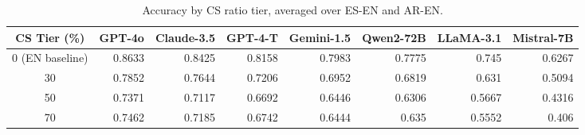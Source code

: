 \begin{table}[t]
\centering
\caption{Accuracy by CS ratio tier, averaged over ES-EN and AR-EN.}
\label{tab:dose_response}
\begin{tabular}{crrrrrrr}
\toprule
CS Tier (\%) & GPT-4o & Claude-3.5 & GPT-4-T & Gemini-1.5 & Qwen2-72B & LLaMA-3.1 & Mistral-7B \\
\midrule
0 (EN baseline) & 0.8633 & 0.8425 & 0.8158 & 0.7983 & 0.7775 & 0.745 & 0.6267 \\
30 & 0.7852 & 0.7644 & 0.7206 & 0.6952 & 0.6819 & 0.631 & 0.5094 \\
50 & 0.7371 & 0.7117 & 0.6692 & 0.6446 & 0.6306 & 0.5667 & 0.4316 \\
70 & 0.7462 & 0.7185 & 0.6742 & 0.6444 & 0.635 & 0.5552 & 0.406 \\
\bottomrule
\end{tabular}
\end{table}